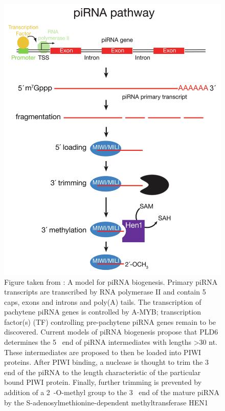 \begin{figure}[htbp]
	\centering 
	\includegraphics{Figures/mammalian_piRNA_pathway.png}
	\caption[A model for Mammalian piRNA biogenesis]
	{
		Figure taken from \citep{Li2013e}: A model for piRNA biogenesis. Primary piRNA transcripts are transcribed by RNA polymerase II and contain 5\textprime~ caps, exons and introns and poly(A) tails. The transcription of pachytene piRNA genes is controlled by A-MYB; transcription factor(s) (TF) controlling pre-pachytene piRNA genes remain to be discovered. Current models of piRNA biogenesis propose that PLD6 determines the 5\textprime~ end of piRNA intermediates with lengths >30 nt. These intermediates are proposed to then be loaded into PIWI proteins. After PIWI binding, a nuclease is thought to trim the 3\textprime~ end of the piRNA to the length characteristic of the particular bound PIWI protein. Finally, further trimming is prevented by addition of a 2\textprime~-O-methyl group to the 3\textprime~ end of the mature piRNA by the S-adenosylmethionine-dependent methyltransferase HEN1
	}
	\label{fig:Mammalian piRNA BioGensis; MolCel2013 Review}
\end{figure}

